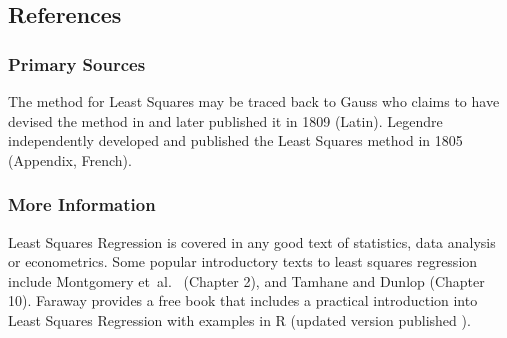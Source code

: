 \subsection{References}

\subsubsection{Primary Sources}
The method for Least Squares may be traced back to Gauss who claims to have devised the method in and later published it in 1809 \cite{Gauss1809, Gauss1823} (Latin). Legendre independently developed and published the Least Squares method in 1805 \cite{Legendre1805} (Appendix, French).

\subsubsection{More Information}
Least Squares Regression is covered in any good text of statistics, data analysis or econometrics. Some popular introductory texts to least squares regression include Montgomery et~al.\ \cite{Montgomery2001} (Chapter 2), and Tamhane and Dunlop \cite{Tamhane2000} (Chapter 10).
Faraway provides a free book that includes a practical introduction into Least Squares Regression with examples in R \cite{Faraway2002} (updated version published \cite{Faraway2004}).


